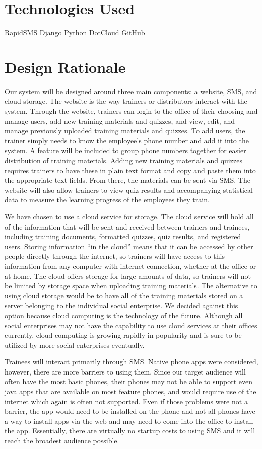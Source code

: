 \section{Technologies Used}
RapidSMS
Django
Python
DotCloud
GitHub

\section{Design Rationale}
Our system will be designed around three main components: a website, SMS, and cloud storage. The website is the way trainers or distributors interact with the system. Through the website, trainers can login to the office of their choosing and manage users, add new training materials and quizzes, and view, edit, and manage previously uploaded training materials and quizzes. To add users, the trainer simply needs to know the employee’s phone number and add it into the system. A feature will be included to group phone numbers together for easier distribution of training materials. Adding new training materials and quizzes requires trainers to have these in plain text format and copy and paste them into the appropriate text fields. From there, the materials can be sent via SMS. The website will also allow trainers to view quiz results and accompanying statistical data to measure the learning progress of the employees they train. 

We have chosen to use a cloud service for storage. The cloud service will hold all of the information that will be sent and received between trainers and trainees, including training documents, formatted quizzes, quiz results, and registered users. Storing information “in the cloud” means that it can be accessed by other people directly through the internet, so trainers will have access to this information from any computer with internet connection, whether at the office or at home. The cloud offers storage for large amounts of data, so trainers will not be limited by storage space when uploading training materials. The alternative to using cloud storage would be to have all of the training materials stored on a server belonging to the individual social enterprise. We decided against this option because cloud computing is the technology of the future. Although all social enterprises may not have the capability to use cloud services at their offices currently, cloud computing is growing rapidly in popularity and is sure to be utilized by more social enterprises eventually.

Trainees will interact primarily through SMS. Native phone apps were considered, however, there are more barriers to using them. Since our target audience will often have the most basic phones, their phones may not be able to support even java apps that are available on most feature phones, and would require use of the internet which again is often not supported. Even if those problems were not a barrier, the app would need to be installed on the phone and not all phones have a way to install apps via the web and may need to come into the office to install the app. Essentially, there are virtually no startup costs to using SMS and it will reach the broadest audience possible.

